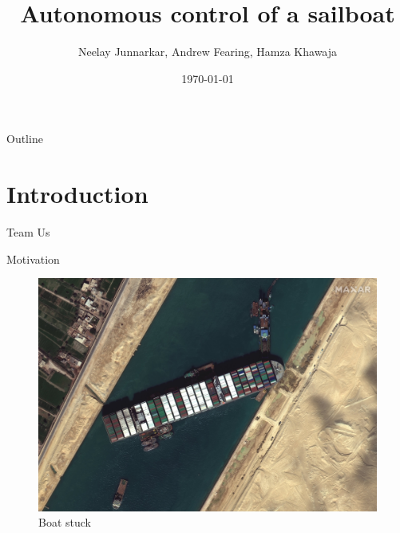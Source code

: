 \documentclass[10pt,xcolor={table,dvipsnames},t]{beamer}
\title[Autosailboat]{Autonomous control of a sailboat}
\author{Neelay Junnarkar, Andrew Fearing, Hamza Khawaja}
\date{\today}
\begin{document}
\begin{frame}
  \titlepage
\end{frame}

\begin{frame}{Outline}
 \tableofcontents
\end{frame}
\section{Introduction}
\begin{frame}{Team}
Us
\end{frame}


\begin{frame}{Motivation}

    \begin{figure}
        \centering
        \includegraphics[width=0.3\linewidth]{documents/figures/Suez_Canal_blocked_by_Ever_Given_March_27_2021.jpg}
        \caption{Boat stuck}
        \label{fig:boat_stuck}
    \end{figure}    
\end{frame}
\end{document}
